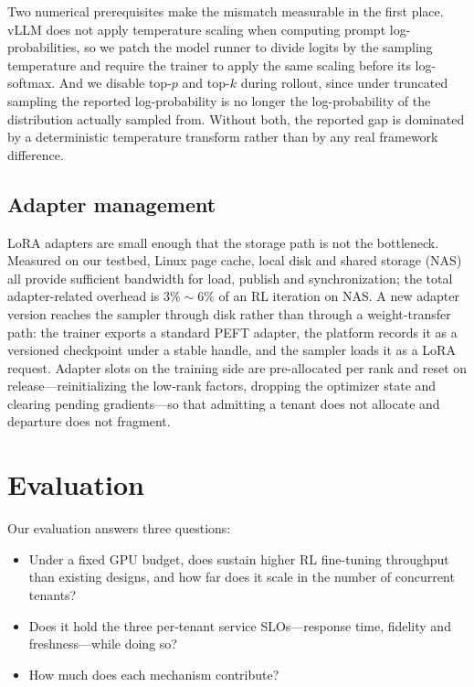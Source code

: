 Two numerical prerequisites make the mismatch measurable in the first place. vLLM does
not apply temperature scaling when computing prompt log-probabilities, so we patch the
model runner to divide logits by the sampling temperature and require the trainer to
apply the same scaling before its log-softmax. And we disable top-$p$ and top-$k$
during rollout, since under truncated sampling the reported log-probability is no
longer the log-probability of the distribution actually sampled from. Without both, the
reported gap is dominated by a deterministic temperature transform rather than by any
real framework difference.

\subsection{Adapter management}
LoRA adapters are small enough that the storage path is not the bottleneck. Measured
on our testbed, Linux page cache, local disk and shared storage (NAS) all provide
sufficient bandwidth for load, publish and synchronization; the total adapter-related
overhead is $3\%\!\sim\!6\%$ of an RL iteration on NAS. A new adapter version reaches
the sampler through disk rather than through a weight-transfer path: the trainer
exports a standard PEFT adapter, the platform records it as a versioned checkpoint
under a stable handle, and the sampler loads it as a LoRA request. Adapter slots on the
training side are pre-allocated per rank and reset on release---reinitializing the
low-rank factors, dropping the optimizer state and clearing pending gradients---so that
admitting a tenant does not allocate and departure does not fragment.

\section{Evaluation\ }
\label{sec:eval}

Our evaluation answers three questions:

\begin{itemize}
    \item Under a fixed GPU budget, does \sysname sustain higher RL fine-tuning
    throughput than existing designs, and how far does it scale in the number of
    concurrent tenants?
    \item Does it hold the three per-tenant service SLOs---response time, fidelity and
    freshness---while doing so?
    \item How much does each mechanism contribute?
\end{itemize}

